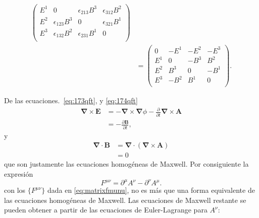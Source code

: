\begin{frame}
\begin{align}
\begin{pmatrix}
    E^1&0     &\epsilon_{213}B^3&\epsilon_{312}B^2\\
    E^2&\epsilon_{123}B^3&0     &\epsilon_{321}B^1\\
    E^3&\epsilon_{132}B^2&\epsilon_{231}B^1&0\\
  \end{pmatrix}\nonumber\\
  &=
\label{eq:matrixfmunu}
  \begin{pmatrix}
    0 &-E^1&-E^2&-E^3   \\    
    E^1&0  &-B^3&B^2\\
    E^2&B^3 &0  &-B^1\\
    E^3&-B^2&B^1 &0\\
  \end{pmatrix}.
\end{align}


De las ecuaciones.~\eqref{eq:173qft}, y \eqref{eq:174qft}
\begin{align*}
  \boldsymbol{\nabla}\times \mathbf{E}&=-\boldsymbol{\nabla}\times \boldsymbol{\nabla}\phi-\frac{\partial}{\partial t}\boldsymbol{\nabla}\times \mathbf{A}\\
  &=-\frac{\partial\mathbf{B}}{\partial t},
\end{align*}
y
\begin{align*}
  \boldsymbol{\nabla}\cdot\mathbf{B}&=\boldsymbol{\nabla}\cdot(\boldsymbol{\nabla}\times \mathbf{A})\\
  &=0
\end{align*}
que son justamente las ecuaciones homogéneas de  Maxwell. Por
consiguiente la expresión  
 \begin{equation}
  \label{eq:fmunu}
    F^{\mu\nu}=\partial^\mu A^\nu-\partial^\nu A^\mu.
\end{equation}
con los $\{F^{\mu\nu}\}$ dada en \eqref{eq:matrixfmunu}, no es más que
una forma equivalente de las ecuaciones homogéneas de Maxwell. Las
ecuaciones de Maxwell restante se pueden obtener a partir de las
ecuaciones de Euler-Lagrange para $A^\nu$:



\end{frame}
